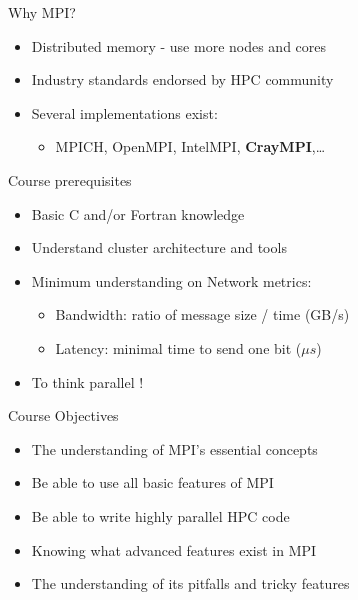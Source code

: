 \documentclass[aspectratio=43]{beamer}
\begin{document}
\cscstitle

\begin{frame}{Why MPI?}
\begin{itemize}
    \item Distributed memory - use more nodes and cores
    \item Industry standards endorsed by HPC community
    \item Several implementations exist:
    \begin{itemize}
        \item MPICH, OpenMPI, IntelMPI, \textbf{CrayMPI},\ldots
    \end{itemize}
\end{itemize}
\end{frame}

\begin{frame}{Course prerequisites}
\begin{itemize}
    \item Basic C and/or Fortran knowledge
    \item Understand cluster architecture and tools
    \item Minimum understanding on Network metrics:
    \begin{itemize}
        \item Bandwidth: ratio of message size / time (GB/s)
        \item Latency: minimal time to send one bit ($\mu s$)
    \end{itemize}
    \item To think parallel !
\end{itemize}
\end{frame}

\begin{frame}{Course Objectives}
\begin{itemize}
\item The understanding of MPI's essential concepts
\item Be able to use all basic features of MPI
\item Be able to write highly parallel HPC code
\item Knowing what advanced features exist in MPI
\item The understanding of its pitfalls and tricky features
\end{itemize}
\end{frame}
\end{document}
